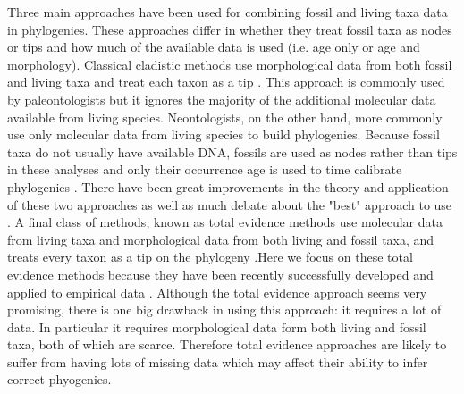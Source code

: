 \documentclass[12pt,letterpaper]{article}
\begin{document}
Three main approaches have been used for combining fossil and living taxa data in phylogenies. These approaches differ in whether they treat fossil taxa as nodes or tips and how much of the available data is used (i.e. age only or age and morphology). Classical cladistic methods use morphological data from both fossil and living taxa and treat each taxon as a tip \citep{simpson1945}. This approach is commonly used by paleontologists but it ignores
the majority of %
the additional molecular data available from living species. Neontologists, on the other hand, more commonly use only molecular data from living species to build phylogenies. Because fossil taxa do not usually have available DNA, fossils are used as nodes rather than tips in these analyses and only their occurrence age is used to time calibrate phylogenies \citep{zuckerkandl1965}. There have been great improvements in the theory and application of these two approaches \citep[e.g.][]{bapsta2013,stadlerdating2013,heaththe2013} %
as well as much debate about the "best" approach to use \citep[e.g.][]{spencerefficacy2013}. A final class of methods, known as total evidence methods use molecular data from living taxa and morphological data from both living and fossil taxa, and treats every taxon as a tip on the phylogeny \citep{eernissetaxonomic1993}.Here we focus on these total evidence methods because they have been recently
successfully developed and applied to empirical data %
\citep{pyrondivergence2011,ronquista2012,schragocombining2013}. Although the total evidence approach seems very promising, there is one big drawback in using this approach: it requires a lot of data. In particular it requires morphological data form both living and fossil taxa, both of which are scarce. Therefore total evidence approaches are likely to suffer from having lots of missing data which may affect their ability to infer correct phyogenies. %
\end{document}
